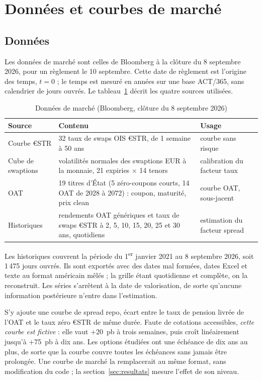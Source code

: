 \section{Données et courbes de marché}
\label{sec:donnees}

\subsection{Données}

Les données de marché sont celles de Bloomberg à la clôture du 8 septembre 2026, pour un règlement le
10 septembre. Cette date de règlement est l'origine des temps, $t=0$ ; le temps est mesuré en années sur une base
ACT/365, sans calendrier de jours ouvrés. Le tableau~\ref{tab:donnees} décrit les quatre sources utilisées.

\begin{table}[htbp]
\centering\small
\caption{Données de marché (Bloomberg, clôture du 8 septembre 2026)}
\label{tab:donnees}
\begin{tabularx}{\textwidth}{@{}l X X@{}}
\toprule
Source & Contenu & Usage \\
\midrule
Courbe €STR & 32 taux de swaps OIS €STR, de 1 semaine à 50 ans & courbe sans risque \\
Cube de swaptions & volatilités normales des swaptions EUR à la monnaie, 21 expiries $\times$ 14 tenors & calibration du facteur taux \\
OAT & 19 titres d'État (5 zéro-coupons courts, 14 OAT de 2028 à 2072) : coupon, maturité, prix clean & courbe OAT, sous-jacent \\
Historiques & rendements OAT génériques et taux de swaps €STR à 2, 5, 10, 15, 20, 25 et 30 ans, quotidiens & estimation du facteur spread \\
\bottomrule
\end{tabularx}
\end{table}

Les historiques couvrent la période du 1\textsuperscript{er} janvier 2021 au 8 septembre 2026, soit 1\,475 jours
ouvrés. Ils sont exportés avec des dates mal formées, dates Excel et texte au format américain mêlés ; la grille
étant quotidienne et complète, on la reconstruit. Les séries s'arrêtent à la date de valorisation, de sorte
qu'aucune information postérieure n'entre dans l'estimation.

S'y ajoute une courbe de spread repo, écart entre le taux de pension livrée de l'OAT et le taux zéro €STR de même
durée. Faute de cotations accessibles, \emph{cette courbe est fictive} : elle vaut +20~pb à trois semaines, puis
croît linéairement jusqu'à +75~pb à dix ans. Les options étudiées ont une échéance de dix ans au plus, de sorte
que la courbe couvre toutes les échéances sans jamais être prolongée. Une courbe de marché la remplacerait au même
format, sans modification du code ; la section~\ref{sec:resultats} mesure l'effet de son niveau.

